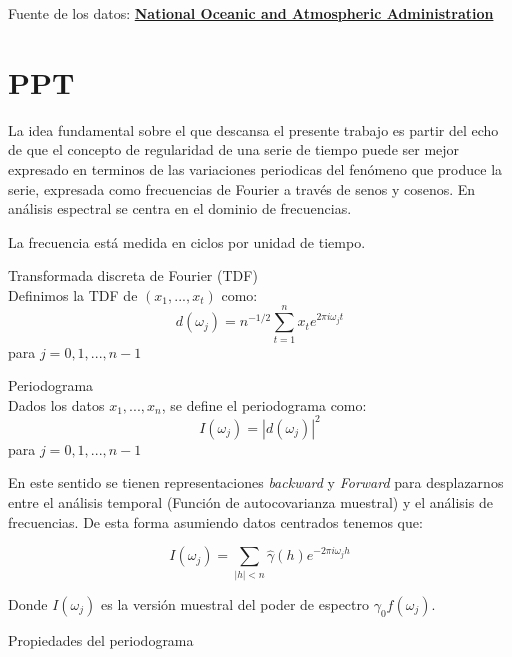 \documentclass[a4paper,10pt]{article}
\begin{document}
\noindent Fuente de los datos: 
\textcolor{blue}{\href{https://datamarket.com/data/set/4lqc/weather-measurements-from-the-global-historical-climatology-network-daily\#!ds=4lqc!7v8s=2l6:7v8t=1&display=line}{\textbf{National Oceanic and Atmospheric Administration}}}

\section{PPT}

La idea fundamental sobre el que descansa el presente trabajo es partir del echo de que el concepto de regularidad de una serie de tiempo puede ser mejor expresado en terminos de las variaciones periodicas del fen\'omeno que produce la serie, expresada como frecuencias de Fourier a trav\'es de senos y cosenos. En an\'alisis espectral se centra en el dominio de frecuencias.

La frecuencia est\'a medida en ciclos por unidad de tiempo.

\begin{definition}{Transformada discreta de Fourier (TDF)}
\\[0.25cm]\noindent Definimos la TDF de $(x_{1}, ..., x_{t})$ como:
$$d(\omega_j)=n^{-1/2} \sum_{t=1}^n x_t e^{2 \pi i \omega_j t}$$
\noindent para $j = 0,1,..., n - 1$
\end{definition}


\begin{definition}{Periodograma}
\\[0.25cm]\noindent Dados los datos $x_{1}, ..., x_{n}$, se define el periodograma como:
$$I(\omega_j)= |d(\omega_j)|^2$$
\noindent para $j = 0,1,..., n - 1$
\end{definition}

\noindent En este sentido se tienen representaciones {\em backward} y {\em Forward} para desplazarnos entre el an\'alisis temporal (Funci\'on de autocovarianza muestral) y el an\'alisis de frecuencias. De esta forma asumiendo datos centrados tenemos que:

\begin{equation}
I(\omega_j)=\sum_{|h|<n} \hat{\gamma}(h) e^{-2 \pi i \omega_j h}
\end{equation}

\noindent Donde $I(\omega_j)$ es la versi\'on muestral del poder de espectro $\gamma _{0}f(\omega_j)$.

\begin{center}
Propiedades del periodograma
\end{center}
\end{document}
